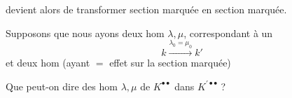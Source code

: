 devient alors de transformer section marquée en section marquée.

Supposons que nous ayons deux hom $\lambda,\mu$, correspondant à un \uuline{$=$} 
\[
k\xrightarrow{\lambda_0=\mu_0}k'
\]
et deux hom
(ayant $=$ effet sur la section marquée)

Que peut-on dire des hom $\lambda,\mu$ de $K^{\bullet\bullet}$ dans $K^{\prime\bullet\bullet}$ ?
